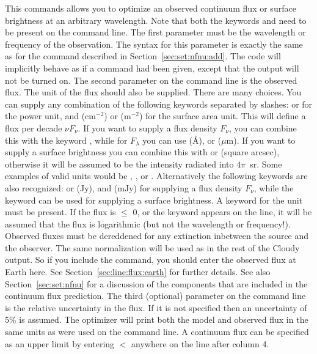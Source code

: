 This commands allows you to optimize an observed continuum flux or surface brightness at an
arbitrary wavelength. Note that both the keywords  and
 need to be present on the command line. The first parameter
must be the wavelength or frequency of the observation. The syntax for this
parameter is exactly the same as for the  command
described in Section~\ref{sec:set:nfnu:add}. The code will implicitly behave
as if a  command had been given, except that the
 output will not be turned on. The second parameter
on the command line is the observed flux. The unit of the flux should also
be supplied. There are many choices. You can supply any combination of the
following keywords separated by slashes:  or 
for the power unit, and  (cm$^{-2}$) or 
(m$^{-2}$) for the surface area unit. This will define a flux per decade $\nu
F_\nu$. If you want to supply a flux density $F_\nu$, you can combine this
with the keyword , while for $F_\lambda$ you can use 
(\AA),  or  ($\mu$m). If you want to supply a surface
brightness you can combine this with  or  (square arcsec),
otherwise it will be assumed to be the intensity radiated into $4\pi$~sr.
Some examples of valid units would be ,
, or . Alternatively the
following keywords are also recognized:  or
 (Jy), and  (mJy) for supplying a flux density $F_\nu$,
while the keyword  can be used for supplying a surface
brightness. A keyword for the unit must be present.
If the flux is $\leq$ 0, or the keyword
 appears on the line, it will be assumed that the flux is
logarithmic (but not the wavelength or frequency!). Observed fluxes must be
dereddened for any extinction inbetween the source and the observer. The same
normalization will be used as in the rest of the Cloudy output. So if you
include the  command, you should enter the
observed flux at Earth here. See Section~\ref{sec:line:flux:earth} for further
details. See also Section~\ref{sec:set:nfnu} for a discussion of the
components that are included in the continuum flux prediction. The third
(optional) parameter on the command line is the relative uncertainty in the
flux. If it is not specified then an uncertainty of 5\% is assumed. The optimizer
will print both the model and observed flux in the same units as were used on the
command line.
A continuum flux can be specified as an upper limit by entering
$<$ anywhere on the line after column 4.

